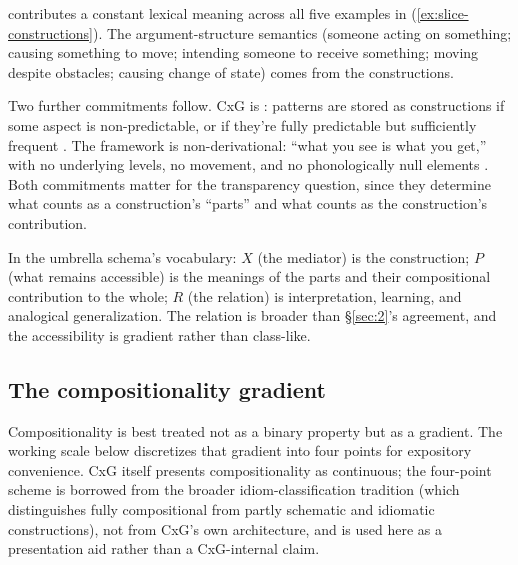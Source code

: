  contributes a constant lexical meaning across all five examples in (\ref{ex:slice-constructions}). The argument-structure semantics (someone acting on something; causing something to move; intending someone to receive something; moving despite obstacles; causing change of state) comes from the constructions.

Two further commitments follow. CxG is : patterns are stored as constructions if some aspect is non-predictable, or if they're fully predictable but sufficiently frequent \autocite[5]{goldberg-2006-constructions-at-work}. The framework is non-derivational: \enquote{what you see is what you get,} with no underlying levels, no movement, and no phonologically null elements \autocite[11]{goldberg-2006-constructions-at-work}. Both commitments matter for the transparency question, since they determine what counts as a construction's \enquote{parts} and what counts as the construction's contribution.

In the umbrella schema's vocabulary: $X$ (the mediator) is the construction; $P$ (what remains accessible) is the meanings of the parts and their compositional contribution to the whole; $R$ (the relation) is interpretation, learning, and analogical generalization. The relation is broader than §\ref{sec:2}'s agreement, and the accessibility is gradient rather than class-like.

\subsection{The compositionality gradient}\label{sec:3-2}

Compositionality is best treated not as a binary property but as a gradient. The working scale below discretizes that gradient into four points for expository convenience. CxG itself presents compositionality as continuous; the four-point scheme is borrowed from the broader idiom-classification tradition (which distinguishes fully compositional from partly schematic and idiomatic constructions), not from CxG's own architecture, and is used here as a presentation aid rather than a CxG-internal claim.

